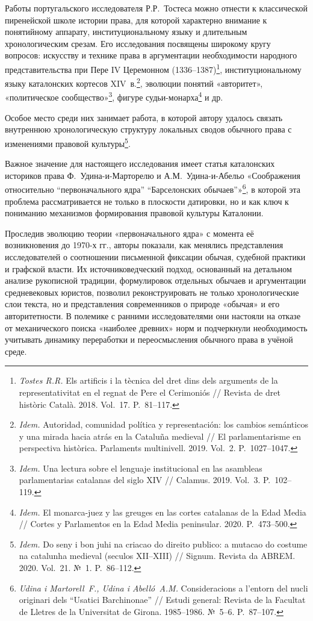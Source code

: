 Работы португальского исследователя Р.Р.~Тостеса можно отнести к классической пиренейской школе истории права, для которой характерно внимание к понятийному аппарату, институциональному языку и длительным хронологическим срезам. Его исследования посвящены широкому кругу вопросов: искусству и технике права в аргументации необходимости народного представительства при Пере IV Церемонном (1336--1387)\footnote{\emph{Tostes R.R.} Els artificis i la tècnica del dret dins dels arguments de la representativitat en el regnat de Pere el Cerimoniós // Revista de dret històric Català. 2018. Vol.~17. P.~81--117.}, институциональному языку каталонских кортесов XIV~в.\footnote{\emph{Idem.} Autoridad, comunidad política y representación: los cambios semánticos y una mirada hacia atrás en la Cataluña medieval // El parlamentarisme en perspectiva històrica. Parlaments multinivell. 2019. Vol.~2. P.~1027--1047.}, эволюции понятий «авторитет», «политическое сообщество»\footnote{\emph{Idem.} Una lectura sobre el lenguaje institucional en las asambleas parlamentarias catalanas del siglo XIV // Calamus. 2019. Vol.~3. P.~102--119.}, фигуре судьи-монарха\footnote{\emph{Idem.} El monarca-juez y las greuges en las cortes catalanas de la Edad Media // Cortes y Parlamentos en la Edad Media peninsular. 2020. P.~473--500.} и др.

Особое место среди них занимает работа, в которой автору удалось связать внутреннюю хронологическую структуру локальных сводов обычного права с изменениями правовой культуры\footnote{\emph{Idem.} Do seny i bon juhi na criacao do direito publico: a mutacao do costume na catalunha medieval (seculos XII--XIII) // Signum. Revista da ABREM. 2020. Vol.~21. №~1. P.~86--112.}.

Важное значение для настоящего исследования имеет статья каталонских историков права Ф.~Удина-и-Марторелю и А.М.~Удина-и-Абельо «Соображения относительно “первоначального ядра” “Барселонских обычаев”»\footnote{\emph{Udina i Martorell~F., Udina i Abelló~A.M.} Consideracions a l’entorn del nucli originari dels “Usatici Barchinonae” // Estudi general: Revista de la Facultat de Lletres de la Universitat de Girona. 1985--1986. №~5--6. P.~87--107.}, в которой эта проблема рассматривается не только в плоскости датировки, но и как ключ к пониманию механизмов формирования правовой культуры Каталонии.

Проследив эволюцию теории «первоначального ядра» с момента её возникновения до 1970-х гг., авторы показали, как менялись представления исследователей о соотношении письменной фиксации обычая, судебной практики и графской власти. Их источниковедческий подход, основанный на детальном анализе рукописной традиции, формулировок отдельных обычаев и аргументации средневековых юристов, позволил реконструировать не только хронологические слои текста, но и представления современников о природе «обычая» и его авторитетности. В полемике с ранними исследователями они настояли на отказе от механического поиска «наиболее древних» норм и подчеркнули необходимость учитывать динамику переработки и переосмысления обычного права в учёной среде.

